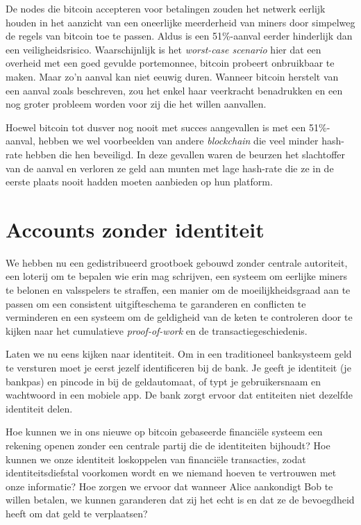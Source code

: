 \documentclass[smalldemyvopaper,11pt,twoside,onecolumn,openright,extrafontsizes]{memoir}
\begin{document}
De nodes die bitcoin accepteren voor betalingen zouden het netwerk eerlijk houden in het aanzicht van een oneerlijke meerderheid van miners door simpelweg de regels van bitcoin toe te passen. Aldus is een 51\%-aanval eerder hinderlijk dan een veiligheidsrisico. Waarschijnlijk is het \textit{worst-case scenario} hier dat een overheid met een goed gevulde portemonnee, bitcoin probeert onbruikbaar te maken. Maar zo’n aanval kan niet eeuwig duren. Wanneer bitcoin herstelt van een aanval zoals beschreven, zou het enkel haar veerkracht benadrukken en een nog groter probleem worden voor zij die het willen aanvallen.

Hoewel bitcoin tot dusver nog nooit met succes aangevallen is met een 51\%-aanval, hebben we wel voorbeelden van andere \textit{blockchain} die veel minder hash-rate hebben die hen beveiligd. In deze gevallen waren de beurzen het slachtoffer van de aanval en verloren ze geld aan munten met lage hash-rate die ze in de eerste plaats nooit hadden moeten aanbieden op hun platform.



\chapter{Accounts zonder identiteit}

We hebben nu een gedistribueerd grootboek gebouwd zonder centrale autoriteit, een loterij om te bepalen wie erin mag schrijven, een systeem om eerlijke miners te belonen en valsspelers te straffen, een manier om de moeilijkheidsgraad aan te passen om een consistent uitgifteschema te garanderen en conflicten te verminderen en een systeem om de geldigheid van de keten te controleren door te kijken naar het cumulatieve \textit{proof-of-work} en de transactiegeschiedenis.

Laten we nu eens kijken naar identiteit. Om in een traditioneel banksysteem geld te versturen moet je eerst jezelf identificeren bij de bank. Je geeft je identiteit (je bankpas) en pincode in bij de geldautomaat, of typt je gebruikersnaam en wachtwoord in een mobiele app. De bank zorgt ervoor dat entiteiten niet dezelfde identiteit delen.

Hoe kunnen we in ons nieuwe op bitcoin gebaseerde financiële systeem een rekening openen zonder een centrale partij die de identiteiten bijhoudt? Hoe kunnen we onze identiteit loskoppelen van financiële transacties, zodat identiteitsdiefstal voorkomen wordt en we niemand hoeven te vertrouwen met onze informatie? Hoe zorgen we ervoor dat wanneer Alice aankondigt Bob te willen betalen, we kunnen garanderen dat zij het echt is en dat ze de bevoegdheid heeft om dat geld te verplaatsen?
\end{document}
